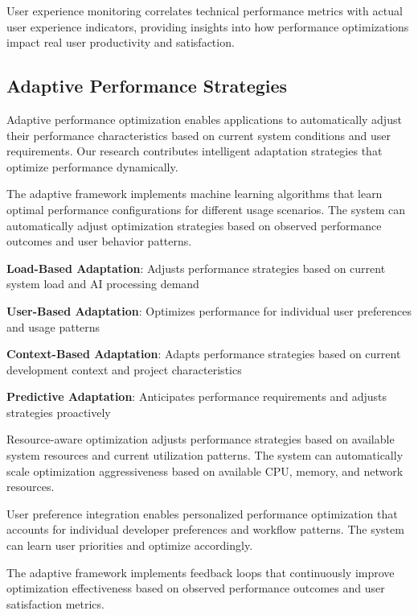 User experience monitoring correlates technical performance metrics with actual user experience indicators, providing insights into how performance optimizations impact real user productivity and satisfaction.

\subsection*{Adaptive Performance Strategies}

Adaptive performance optimization enables applications to automatically adjust their performance characteristics based on current system conditions and user requirements. Our research contributes intelligent adaptation strategies that optimize performance dynamically.

The adaptive framework implements machine learning algorithms that learn optimal performance configurations for different usage scenarios. The system can automatically adjust optimization strategies based on observed performance outcomes and user behavior patterns.

\begin{expandedlist}
    \item \textbf{Load-Based Adaptation}: Adjusts performance strategies based on current system load and AI processing demand
    \item \textbf{User-Based Adaptation}: Optimizes performance for individual user preferences and usage patterns
    \item \textbf{Context-Based Adaptation}: Adapts performance strategies based on current development context and project characteristics
    \item \textbf{Predictive Adaptation}: Anticipates performance requirements and adjusts strategies proactively
\end{expandedlist}

Resource-aware optimization adjusts performance strategies based on available system resources and current utilization patterns. The system can automatically scale optimization aggressiveness based on available CPU, memory, and network resources.

User preference integration enables personalized performance optimization that accounts for individual developer preferences and workflow patterns. The system can learn user priorities and optimize accordingly.

The adaptive framework implements feedback loops that continuously improve optimization effectiveness based on observed performance outcomes and user satisfaction metrics.

